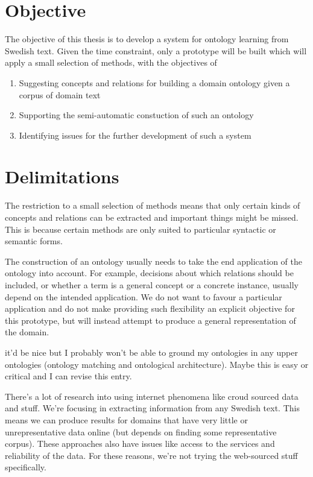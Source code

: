 \documentclass[a4paper]{report}
\newcommand{\todo}[1]{}
\begin{document}
\section{Objective}
\label{sec:intro:objective}

The objective of this thesis is to develop a system for ontology learning from Swedish text.
Given the time constraint, only a prototype will be built which will apply a small selection of methods, with the objectives of
\begin{enumerate}
  \item Suggesting concepts and relations for building a domain ontology given a corpus of domain text
  \item Supporting the semi-automatic constuction of such an ontology
  \item Identifying issues for the further development of such a system
\end{enumerate}

\section{Delimitations}
\label{sec:intro:delimitations}

The restriction to a small selection of methods means that only certain kinds of concepts and relations can be extracted and important things might be missed.
This is because certain methods are only suited to particular syntactic or semantic forms.

The construction of an ontology usually needs to take the end application of the ontology into account.
For example, decisions about which relations should be included, or whether a term is a general concept or a concrete instance, usually depend on the intended application.
We do not want to favour a particular application and do not make providing such flexibility an explicit objective for this prototype, but will instead attempt to produce a general representation of the domain.

\todo{not sure if the following is relevant to this section but leaving here for now.}
it'd be nice but I probably won't be able to ground my ontologies in any upper ontologies (ontology matching and ontological architecture).
Maybe this is easy or critical and I can revise this entry.

There's a lot of research into using internet phenomena like croud sourced data and stuff.
We're focusing in extracting information from any Swedish text.
This means we can produce results for domains that have very little or unrepresentative data online (but depends on finding some representative corpus).
These approaches also have issues like access to the services and reliability of the data.
For these reasons, we're not trying the web-sourced stuff specifically.
\end{document}
